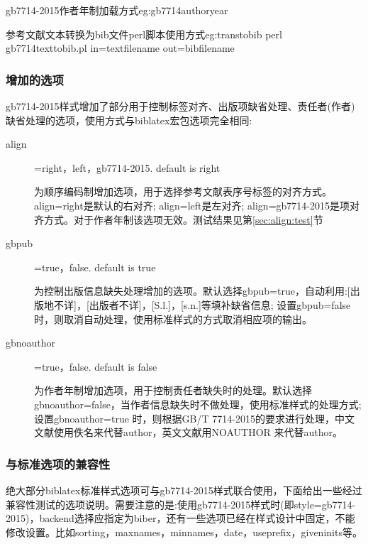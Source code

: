 \begin{codetex}{gb7714-2015作者年制加载方式}{eg:gb7714authoryear}
\usepackage[backend=biber,style=gb7714-2015ay]{biblatex}
\usepackage[backend=biber,style=gb7714-2015ay,gbpub=true,gbnoauthor=true]{biblatex}
\end{codetex}

\begin{codetex}{参考文献文本转换为bib文件perl脚本使用方式}{eg:transtobib}
perl gb7714texttobib.pl in=textfilename out=bibfilename
\end{codetex}

\subsubsection{增加的选项}
gb7714-2015样式增加了部分用于控制标签对齐、出版项缺省处理、责任者(作者)缺省处理的选项，使用方式与biblatex宏包选项完全相同:
\begin{description}
  \item[align]=right，left，gb7714-2015. \hfill default is right

  为顺序编码制增加选项，用于选择参考文献表序号标签的对齐方式。align=right是默认的右对齐; align=left是左对齐; align=gb7714-2015是项对齐方式。对于作者年制该选项无效。测试结果见第\ref{sec:align:test}节

  \item[gbpub]=true，false. \hfill default is true

  为控制出版信息缺失处理增加的选项。默认选择gbpub=true，自动利用:[出版地不详]，[出版者不详]，[S.l.]，[s.n.]等填补缺省信息; 设置gbpub=false 时，则取消自动处理，使用标准样式的方式取消相应项的输出。

  \item[gbnoauthor]=true，false. \hfill default is false

  为作者年制增加选项，用于控制责任者缺失时的处理。默认选择gbnoauthor=false，当作者信息缺失时不做处理，使用标准样式的处理方式; 设置gbnoauthor=true 时，则根据GB/T 7714-2015的要求进行处理，中文文献使用佚名来代替author，英文文献用NOAUTHOR 来代替author。
\end{description}


\subsubsection{与标准选项的兼容性}
绝大部分biblatex标准样式选项可与gb7714-2015样式联合使用，下面给出一些经过兼容性测试的选项说明。需要注意的是:使用gb7714-2015样式时(即style=gb7714-2015)，backend选择应指定为biber，还有一些选项已经在样式设计中固定，不能修改设置。比如sorting，maxnames，minnames，date，useprefix，giveninits等。

